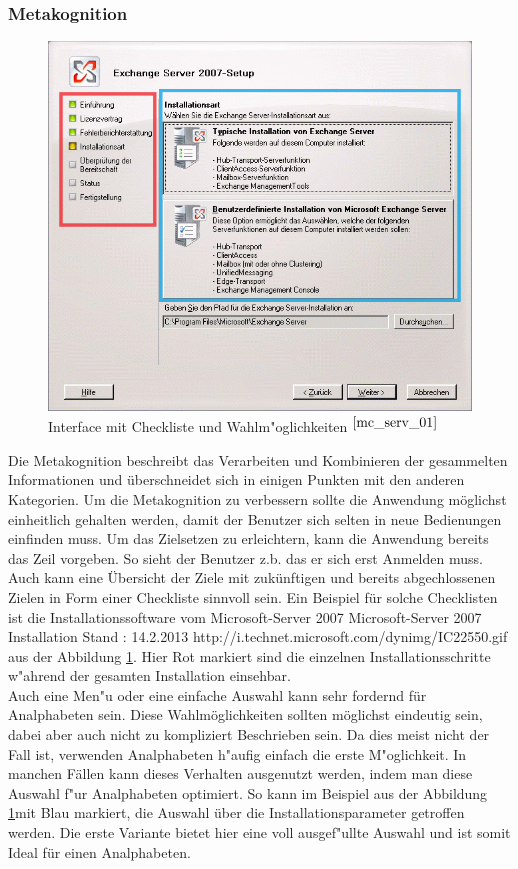 \subsubsection{Metakognition}
\begin{figure}[h]
	\centering
		\includegraphics[width=1.00\textwidth]{Daten/ServerBeispiel.png}
	\caption{Interface mit Checkliste und Wahlm"oglichkeiten $^{\ref{mc_serv_01}}$}
	\label{fig:InstallBsp}
\end{figure}
Die Metakognition beschreibt das Verarbeiten und Kombinieren der gesammelten Informationen und überschneidet sich in einigen Punkten mit den anderen Kategorien. Um die Metakognition zu verbessern sollte die Anwendung möglichst einheitlich gehalten werden, damit der Benutzer sich selten in neue Bedienungen einfinden muss. Um das Zielsetzen zu erleichtern, kann die Anwendung bereits das Zeil vorgeben. So sieht der Benutzer z.b. das er sich erst Anmelden muss. Auch kann eine Übersicht der Ziele mit zukünftigen und bereits abgechlossenen Zielen in Form einer Checkliste sinnvoll sein. Ein Beispiel für solche Checklisten ist die Installationssoftware vom Microsoft-Server 2007
						{Microsoft-Server 2007 Installation}
						{Stand : 14.2.2013}
						{http://i.technet.microsoft.com/dynimg/IC22550.gif} 
aus der Abbildung \ref{fig:InstallBsp}. Hier Rot markiert sind die einzelnen Installationsschritte w"ahrend der gesamten Installation einsehbar.\\
Auch eine Men"u oder eine einfache Auswahl kann sehr fordernd für Analphabeten sein. Diese Wahlmöglichkeiten sollten möglichst eindeutig sein, dabei aber auch nicht zu kompliziert Beschrieben sein. Da dies meist nicht der Fall ist, verwenden Analphabeten h"aufig
einfach die erste M"oglichkeit. In manchen Fällen kann dieses Verhalten ausgenutzt werden, indem man diese Auswahl f"ur Analphabeten optimiert. So kann im Beispiel aus der Abbildung \ref{fig:InstallBsp}mit Blau markiert, die Auswahl über die Installationsparameter getroffen werden. Die erste Variante bietet hier eine voll ausgef"ullte Auswahl und ist somit Ideal für einen Analphabeten.


